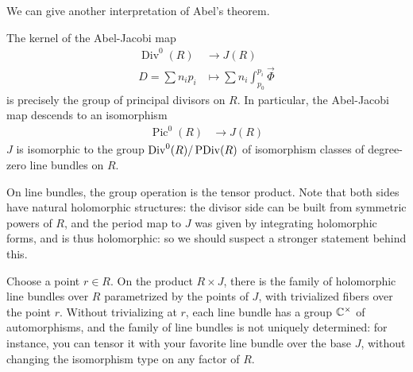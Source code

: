 \documentclass[12pt]{article}
\begin{document}
We can give another interpretation of Abel's theorem.
\begin{theorem}
     The kernel of the Abel-Jacobi map \begin{align*}
        \operatorname{Div}^0(R) & \to J(R) \\
        D = \sum n_i p_i & \mapsto \sum n_i \int_{p_0}^{p_i} \vec{\Phi}
    \end{align*} is precisely the group of principal divisors on $R$. In particular, the Abel-Jacobi map descends to an isomorphism \begin{align*}
        \operatorname{Pic}^0(R) & \to J(R)
    \end{align*}
$J$ is isomorphic to the group $\operatorname{Div}^0(R)/\operatorname{PDiv}(R)$ of isomorphism classes of
degree-zero line bundles on $R$.
\end{theorem}


On line bundles, the group operation is the tensor product.
Note that both sides have natural holomorphic structures:
the divisor side can be built from symmetric powers of $R$,
and the period map to $J$ was given by integrating holomorphic forms,
and is thus holomorphic:
so we should suspect a stronger statement behind this.

Choose a point $r \in R$.
On the product $R \times J$, there is the family of holomorphic line bundles
over $R$ parametrized by the points of $J$, with trivialized fibers over the point $r$.
Without trivializing at $r$, each line bundle has a group $\mathbb{C}^\times$ of automorphisms,
and the family of line bundles is not uniquely determined:
for instance, you can tensor it with your favorite line bundle over the base $J$,
without changing the isomorphism type on any factor of $R$.
\end{document}
